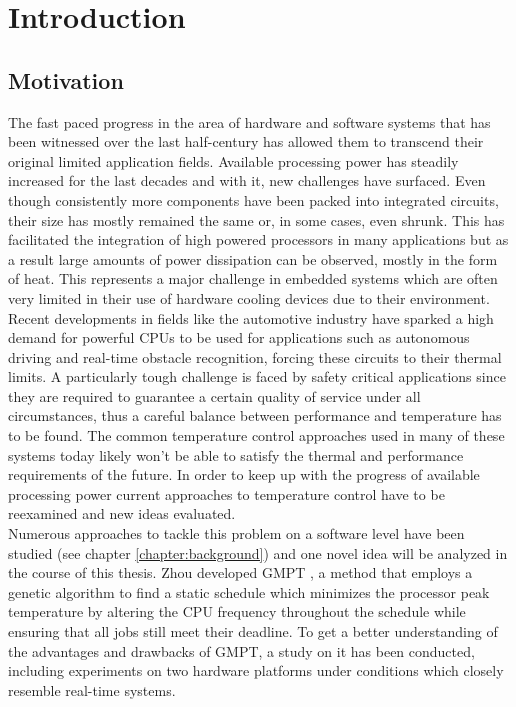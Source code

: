 
\chapter{Introduction}\label{chapter:introduction}
\section{Motivation}
The fast paced progress in the area of hardware and software systems that has been witnessed over the last half-century has allowed them to transcend their original limited application fields. Available processing power has steadily increased for the last decades and with it, new challenges have surfaced. Even though consistently more components have been packed into integrated circuits, their size has mostly remained the same or, in some cases, even shrunk. This has facilitated the integration of high powered processors in many applications but as a result large amounts of power dissipation can be observed, mostly in the form of heat. This represents a major challenge in embedded systems which are often very limited in their use of hardware cooling devices due to their environment. Recent developments in fields like the automotive industry have sparked a high demand for powerful CPUs to be used for applications such as autonomous driving and real-time obstacle recognition, forcing these circuits to their thermal limits. A particularly tough challenge is faced by safety critical applications since they are required to guarantee a certain quality of service under all circumstances, thus a careful balance between performance and temperature has to be found. The common temperature control approaches used in many of these systems today likely won't be able to satisfy the thermal and performance requirements of the future. In order to keep up with the progress of available processing power current approaches to temperature control have to be reexamined and new ideas evaluated.\\
\hspace*{0.5ex}\hspace{0.5ex} Numerous approaches to tackle this problem on a software level have been studied (see chapter \ref{chapter:background}) and one novel idea will be analyzed in the course of this thesis. Zhou developed GMPT \cite{Zhou2017}, a method that employs a genetic algorithm to find a static schedule which minimizes the processor peak temperature by altering the CPU frequency throughout the schedule while ensuring that all jobs still meet their deadline. To get a better understanding of the advantages and drawbacks of GMPT, a study on it has been conducted, including experiments on two hardware platforms under conditions which closely resemble real-time systems.
